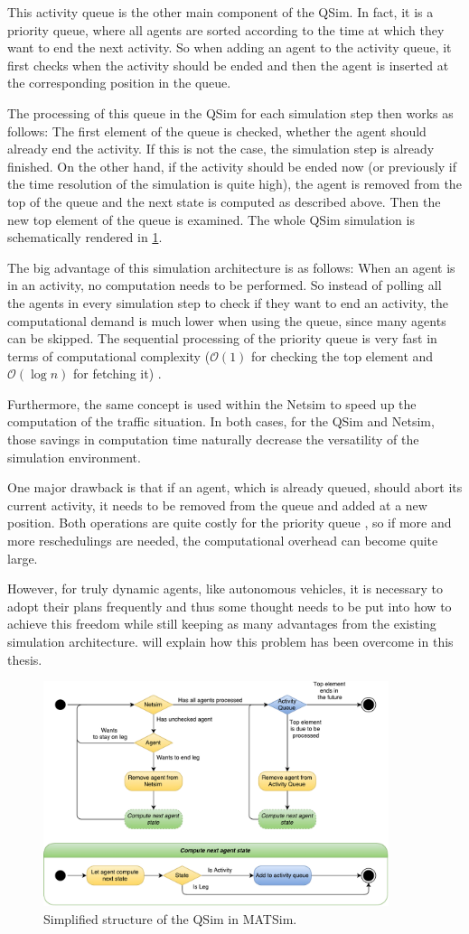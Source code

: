 This activity queue is the other main component of the QSim. In fact, it is a
priority queue, where all agents are sorted according to the time at which they
want to end the next activity. So when adding an agent to the activity queue, it first
checks when the activity should be ended and then the agent is inserted at the
corresponding position in the queue.

The processing of this queue in the QSim for each simulation step then works as
follows: The first element of the queue is checked, whether the
agent should already end the activity. If this is not the case, the simulation step
is already finished. On the other hand, if the activity should be ended now (or
previously if the time resolution of the simulation is quite high), the agent is
removed from the top of the queue and the next state is computed as described above.
Then the new top element of the queue is examined.
The whole QSim simulation is schematically rendered in \cref{fig:qsim}.

The big advantage of this simulation architecture is as follows: When an agent is
in an activity, no computation needs to be performed. So instead of polling all
the agents in every simulation step to check if they want to end an activity, the
computational demand is much lower when using the queue, since many agents can
be skipped. The sequential processing of the priority queue is very fast in terms
of computational complexity ($\mathcal{O}(1)$ for checking the top element
and $\mathcal{O}(\log n)$ for fetching it) \citep{JavaPQ}.

Furthermore, the same concept is used within the Netsim to speed up the computation
of the traffic situation. In both cases, for the QSim and Netsim, those savings in
computation time naturally decrease the versatility of the simulation environment.

One major drawback is that if an agent, which is already queued, should abort its
current activity, it needs to be removed from the queue and added at a new position.
Both operations are quite costly for the priority queue \citep{JavaPQ}, so
if more and more reschedulings are needed, the computational overhead can become
quite large.

However, for truly dynamic agents, like autonomous vehicles, it is necessary to
adopt their plans frequently and thus some thought needs to be put into how to
achieve this freedom while still keeping as many advantages from the existing
simulation architecture.  will explain how this problem has
been overcome in this thesis.

\begin{figure}
    \centering
    \includegraphics[width=0.9\textwidth]{figures/qsim.pdf}
    \caption{Simplified structure of the QSim in MATSim.}
    \label{fig:qsim}
\end{figure}
